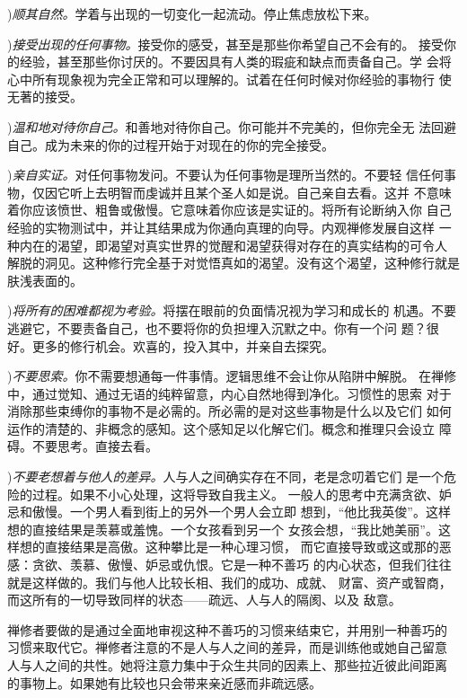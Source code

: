 ){\it 顺其自然。}学着与出现的一切变化一起流动。停止焦虑放松下来。


){\it 接受出现的任何事物。}接受你的感受，甚至是那些\1你希望自己不会有的。
接受你的经验，甚至那些你讨厌的。不要因具有人类的瑕疵和缺点而责备自己。学
会将心中所有现象视为完全正常和可以理解的。试着在任何时候对你经验的事物行
使无著的接受。

){\it 温和地对待你自己。}和善地对待你自己。你可能并不完美的，但你完全无
法回避自己。成为未来的你的过程开始于对现在的你的完全接受。

){\it 亲自实证。}对任何事物发问。不要认为任何事物是理所当然的。不要轻
信任何事物，仅因它听上去明智而虔诚并且某个圣人如是说。自己亲自去看。这并
不意味着你应该愤世、粗鲁或傲慢。它意味着你应该是实证的。将所有论断纳入你
自己经验的实物测试中，并让其结果成为你通向真理的向导。内观禅修发展自这样
一种内在的渴望，即渴望对真实世界的觉醒和渴望获得对存在的真实结构的可令人
解脱的洞见。这种修行完全基于对觉悟真如的渴望。没有这个渴望，这种修行就是
肤浅表面的。

){\it 将所有的困难都视为考验。}将摆在眼前的负面情况视为学习和成长的
机遇。不要逃避它，不要责备自己，也不要将你的负担埋入沉默之中。你有一个问
题？很好。更多的修行机会。欢喜的，投入其中，并亲自去探究。

){\it 不要思索。}你不需要想通每一件事情。逻辑思维不会让你从陷阱中解脱。
在禅修中，通过觉知、通过无语的纯粹留意，内心自然地得到净化。习惯性的思索
对于消除\1那些束缚你的事物不是必需的。所必需的是对这些事物是什么以及它们
如何运作的清楚的、非概念的感知。这个感知足以化解它们。概念和推理只会设立
障碍。不要思考。直接去看。

){\it 不要老想着与他人的差异。}人与人之间确实存在不同，老是念叨着它们
是一个危险的过程。如果不小心处理，这将导致自我主义。
一般人的思考中充满贪欲、妒忌和傲慢。一个男人看到街上的另外一个男人会立即
想到，“他比我英俊”。这样想的直接结果是羡慕或羞愧。一个女孩看到另一个
女孩会想，“我比她美丽”。这样想的直接结果是高傲。这种攀比是一种心理习惯，
而它直接导致或这或那的恶感：贪欲、羡慕、傲慢、妒忌或仇恨。它是一种不善巧
的内心状态，但我们往往就是这样做的。我们与他人比较长相、我们的成功、成就、
财富、资产或智商，而这所有的一切导致同样的状态——疏远、人与人的隔阂、以及
敌意。

禅修者要做的是通过全面地审视这种不善巧的习惯来结束它，并用别一种善巧的
习惯来取代它。禅修者注意的不是人与人之间的差异，而是训练他或她自己留意
人与人之间的共性。她将注意力集中于众生共同的因素上、那些拉近彼此间距离
的事物上。如果她有比较也只会带来亲近感而非疏远感。

\endchapter

\byebye

